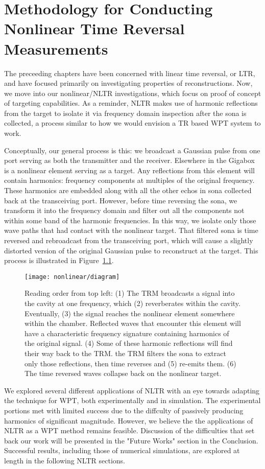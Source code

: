 \chapter{Methodology for Conducting Nonlinear Time Reversal Measurements}
\label{ch:nonlinear-meth}

The preceeding chapters have been concerned with linear time reversal, or LTR, and have focused primarily on investigating properties of reconstructions. Now, we move into our nonlinear/NLTR investigations, which focus on proof of concept of targeting capabilities. As a reminder, NLTR makes use of harmonic reflections from the target to isolate it via frequency domain inspection after the sona is collected, a process similar to how we would envision a TR based WPT system to work. 

Conceptually, our general process is this: we broadcast a Gaussian pulse from one port serving as both the transmitter and the receiver. Elsewhere in the Gigabox is a nonlinear element serving as a target. Any reflections from this element will contain harmonics: frequency components at multiples of the original frequency. These harmonics are embedded along with all the other echos in sona collected back at the transceiving port. However, before time reversing the sona, we transform it into the frequency domain and filter out all the components not within some band of the harmonic frequencies. In this way, we isolate only those wave paths that had contact with the nonlinear target. That filtered sona is time reversed and rebroadcast from the transceiving port, which will cause a slightly distorted version of the original Gaussian pulse to reconstruct at the target. This process is illustrated in Figure~\ref{fig:nonlinear-diagram}.

\begin{figure}[h!]
\centering
\texttt{[image: nonlinear/diagram]}
    \caption[Conceptual overview of nonlinear time reversal]{Reading order from top left: (1) The TRM broadcasts a signal into the cavity at one frequency, which (2) reverberates within the cavity. Eventually, (3) the signal reaches the nonlinear element somewhere within the chamber. Reflected waves that encounter this element will have a characteristic frequency signature containing harmonics of the original signal. (4) Some of these harmonic reflections will find their way back to the TRM. the TRM filters the sona to extract only those reflections, then time reverses and (5) re-emits them. (6) The time reversed waves collapse back on the nonlinear target.}
    \label{fig:nonlinear-diagram}
\end{figure}

We explored several different applications of NLTR with an eye towards adapting the technique for WPT, both experimentally and in simulation. The experimental portions met with limited success due to the diffculty of passively producing harmonics of significant magnitude. However, we believe the the applications of NLTR as a WPT method remains feasible. Discussion of the difficulties that set back our work will be presented in the "Future Works" section in the Conclusion. Successful results, including those of numerical simulations, are explored at length in the following NLTR sections. 

